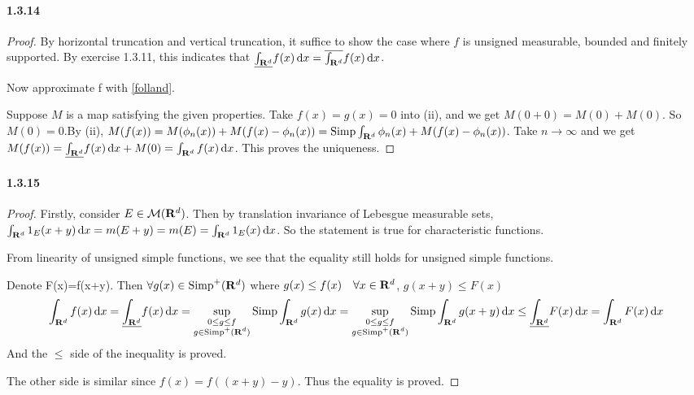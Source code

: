 \documentclass{article}
\begin{document}
\paragraph{1.3.14}
\begin{proof}
By horizontal truncation and vertical truncation, it suffice to show the case where $f$ is unsigned measurable, bounded and finitely supported. By exercise 1.3.11, this indicates that $\uit f(x) \dx=\oit f(x)\dx$.

Now approximate f with \ref{folland}.

Suppose $M$ is a map satisfying the given properties. Take $f(x)=g(x)=0$ into (ii), and we get $M(0+0)=M(0)+M(0)$. So $M(0)=0$.By (ii), $M(f(x))=M(\phi_n(x))+M(f(x)-\phi_n(x))=\mathrm{Simp}\int_{\mathbf{R}^d} \phi_n(x)+M(f(x)-\phi_n(x))$. Take $n\to\infty$ and we get $M(f(x))=\uit f(x)\dx +M(0)=\cit f(x)\dx$. This proves the uniqueness.
\end{proof}

\paragraph{1.3.15}
\begin{proof}
Firstly, consider $E\in \mathcal{M}(\mathbf{R}^d)$. Then by translation invariance of Lebesgue measurable sets, $\int_{\mathbf{R}^d} 1_E(x+y)\,\mathrm{d} x=m(E+y)=m(E)=\int_{\mathbf{R}^d} 1_{E}(x)\,\mathrm{d} x$. So the statement is true for characteristic functions. 

From linearity of unsigned simple functions, we see that the equality still holds for unsigned simple functions.

Denote F(x)=f(x+y). Then $\forall g(x)\in \mathrm{Simp}^+({\mathbf{R}^d})$ where $g(x)\leq f(x)\quad\forall x\in \mathbf{R}^d$, $g(x+y)\leq F(x)$ 
\[\cit f(x)\dx =\uit f(x)\dx= \sup\limits_{\substack{0\leq g\leq f\\g \in\uspf}}\sit g(x)\dx =\sup\limits_{\substack{0\leq g\leq f\\g\in\uspf}}\sit g(x+y)\dx\leq\uit F(x)\dx =\cit F(x)\dx\]
And the $\leq$ side of the inequality is proved.

The other side is similar since $f(x)=f((x+y)-y)$. Thus the equality is proved.
\end{proof}
\end{document}
